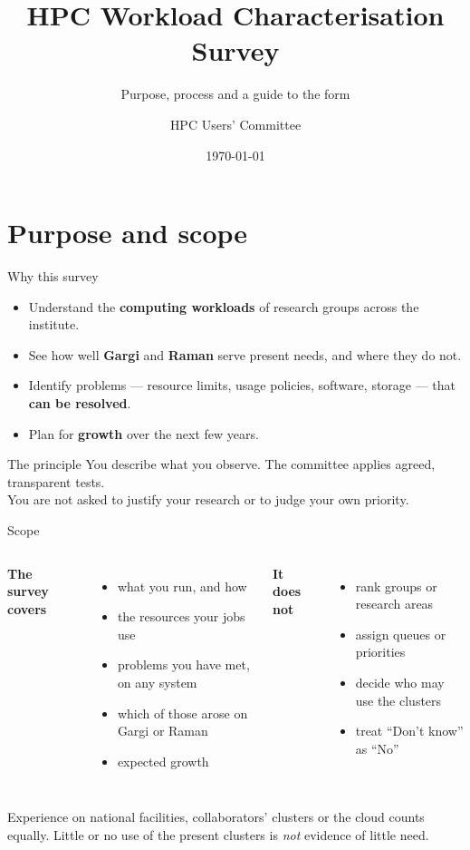 \documentclass[aspectratio=169,11pt]{beamer}
\title{HPC Workload Characterisation Survey}
\subtitle{Purpose, process and a guide to the form}
\author{HPC Users' Committee}
\institute{IISER Bhopal}
\date{\today}
\newcommand{\term}[1]{\textbf{\textcolor{iiser}{#1}}}
\begin{document}
\maketitle

\section{Purpose and scope}

\begin{frame}{Why this survey}
  \begin{itemize}\setlength{\itemsep}{2pt}
    \item Understand the \term{computing workloads} of research groups across the institute.
    \item See how well \term{Gargi} and \term{Raman} serve present needs, and where they do not.
    \item Identify problems --- resource limits, usage policies, software, storage --- that \term{can be resolved}.
    \item Plan for \term{growth} over the next few years.
  \end{itemize}
  \medskip
  \begin{block}{The principle}
    You describe what you observe. The committee applies agreed, transparent tests.\\
    You are not asked to justify your research or to judge your own priority.
  \end{block}
\end{frame}

\begin{frame}{Scope}
  \begin{columns}[T]
    \textbf{The survey covers}
    \begin{itemize}
      \item what you run, and how
      \item the resources your jobs use
      \item problems you have met, on any system
      \item which of those arose on Gargi or Raman
      \item expected growth
    \end{itemize}
    \textbf{It does not}
    \begin{itemize}
      \item rank groups or research areas
      \item assign queues or priorities
      \item decide who may use the clusters
      \item treat ``Don't know'' as ``No''
    \end{itemize}
  \end{columns}
  \vfill
  \small Experience on national facilities, collaborators' clusters or the cloud counts equally.
  Little or no use of the present clusters is \emph{not} evidence of little need.
\end{frame}
\end{document}
